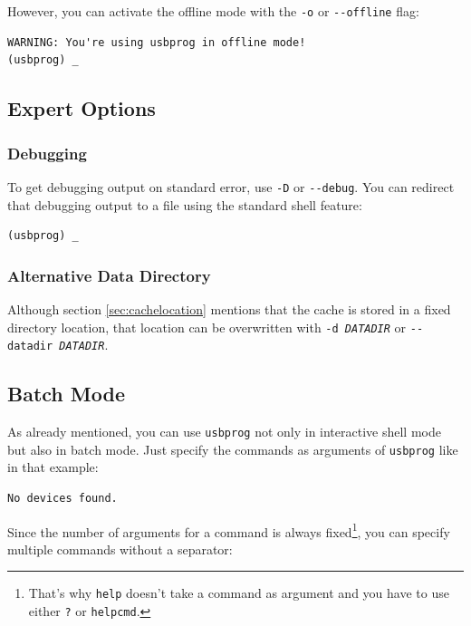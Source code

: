 \documentclass[bibtotoc,UKenglish,halfparskip,oneside,DIV12]{scrreprt}
\begin{document}
However, you can activate the offline mode with the \texttt{-o} or \texttt{-{-}offline} flag:

\begin{lstlisting}[style=inline]
% usbprog -o
WARNING: You're using usbprog in offline mode!
(usbprog) _
\end{lstlisting}

\subsection{Expert Options}

\subsubsection{Debugging}

To get debugging output on standard error, use \texttt{-D} or \texttt{-{-}debug}. You can redirect
that debugging output to a file using the standard shell feature:

\begin{lstlisting}[style=inline]
% usbprog --debug 2> debug.log
(usbprog) _
\end{lstlisting}

\subsubsection{Alternative Data Directory}

Although section \vref{sec:cachelocation} mentions that the cache is stored in a fixed directory
location, that location can be overwritten with \texttt{-d \emph{DATADIR}} or \texttt{-{-}datadir
\emph{DATADIR}}.

\subsection{Batch Mode}

As already mentioned, you can use \texttt{usbprog} not only in interactive shell mode but also in
batch mode. Just specify the commands as arguments of \texttt{usbprog} like in that example:

\begin{lstlisting}[style=inline]
% usbprog devices
No devices found.
\end{lstlisting}

Since the number of arguments for a command is always fixed\footnote{That's why \texttt{help}
doesn't take a command as argument and you have to use either \texttt{?} or \texttt{helpcmd}.},
you can specify multiple commands without a separator:
\end{document}
